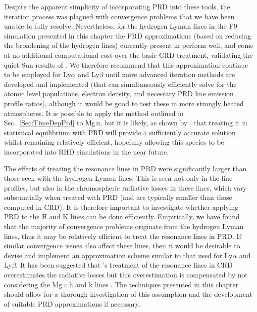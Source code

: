 Despite the apparent simplicity of incorporating PRD into these tools, the iteration process was plagued with convergence problems that we have been unable to fully resolve.
Nevertheless, for the hydrogen Lyman lines in the F9 simulation presented in this chapter the PRD approximations (based on reducing the broadening of the hydrogen lines) currently present in \Radyn{} perform well, and come at no additional computational cost over the basic CRD treatment, validating the quiet Sun results of \citet{Leenaarts2012a}.
We therefore recommend that this approximation continue to be employed for Ly$\alpha$ and Ly$\beta$ until more advanced iteration methods are developed and implemented (that can simultaneously efficiently solve for the atomic level populations, electron density, and necessary PRD line emission profile ratios), although it would be good to test these in more strongly heated atmospheres.
It is possible to apply the method outlined in Sec.~\ref{Sec:TimeDepPrd} to Mg\,\textsc{ii}, but it is likely, as shown by \citet{Kerr2019}, that treating it in statistical equilibrium with PRD will provide a sufficiently accurate solution whilst remaining relatively efficient, hopefully allowing this species to be incorporated into RHD simulations in the near future.

The effects of treating the \Caii{} resonance lines in PRD were significantly larger than those seen with the hydrogen Lyman lines.
This is seen not only in the line profiles, but also in the chromospheric radiative losses in these lines, which vary substantially when treated with PRD (and are typically smaller than those computed in CRD).
It is therefore important to investigate whether applying PRD to the H and K lines can be done efficiently.
Empirically, we have found that the majority of convergence problems originate from the hydrogen Lyman lines, thus it may be relatively efficient to treat the \Caii{} resonance lines in PRD.
If similar convergence issues also affect these lines, then it would be desirable to devise and implement an approximation scheme similar to that used for Ly$\alpha$ and Ly$\beta$.
It has been suggested that \Radyn{}'s treatment of the \Caii{} resonance lines in CRD overestimates the radiative losses but this overestimation is compensated by not considering the Mg\,\textsc{ii} h and k lines \citep[e.g.][]{Kerr2019a}.
The techniques presented in this chapter should allow for a thorough investigation of this assumption and the development of suitable PRD approximations if necessary.
